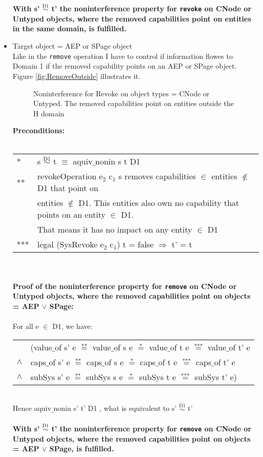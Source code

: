 \begin{itemize}
\textbf{With s' $\overset{\text{D1}}{\sim}$ t' the noninterference property for \texttt{revoke} on CNode or Untyped objects, where the removed capabilities point on entities in the same domain, is fulfilled.}  
\item Target object = AEP or SPage object \\
Like in the \texttt{remove} operation I have to control if information flowes to Domain 1 if the removed capability points on an AEP or SPage object. Figure \ref{fig:RemoveOutside} illustrates it. 
\begin{figure}[H]
\caption{Noninterference for Revoke on object types = CNode or Untyped. The removed capabilities point on entities outside the H domain}
\label{fig:RevokeOutside}
\end{figure}
\textbf{Preconditions:} \\ \\
\begin{tabular}{ll}
* & s $\overset{\text{D1}}{\sim}$ t $\equiv$ aquiv$\_$nonin s t D1	\\ 
** & revokeOperation e$_2$ c$_1$ s removes capabilities $\in$ entities $\notin$ D1 that point on \\
& entities $\notin$ D1. This entities also own no capability that points on an entity $\in$ D1. \\
& That means it has no impact on any entity $\in$ D1 \\ 
*** & legal (SysRevoke e$_2$ c$_1$) t = false $\Rightarrow$ t' = t
\end{tabular} \\ \\ 
\textbf{Proof of the noninterference property for \texttt{remove} on CNode or Untyped objects, where the removed capabilities point on objects = AEP $\vee$ SPage:}\\ \\
For all e $\in$ D1, we have: \\ 
\begin{tabular}{ll}
& (value$\_$of s' e $\overset{\text{**}}{=}$ value$\_$of s e $\overset{\text{*}}{=}$ value$\_$of t e $\overset{\text{***}}{=}$ value$\_$of t' e \\
$\wedge$ & caps$\_$of s' e $\overset{\text{**}}{=}$ caps$\_$of s e $\overset{\text{*}}{=}$ caps$\_$of t e $\overset{\text{***}}{=}$ caps$\_$of t' e \\
$\wedge$ & subSys s' e $\overset{\text{**}}{=}$ subSys s e $\overset{\text{*}}{=}$ subSys t e $\overset{\text{***}}{=}$ subSys t' e)
\end{tabular} \\
Hence aquiv$\_$nonin s' t' D1 , what is equivalent to s' $\overset{\text{D1}}{\sim}$ t'\\ \\ 
\textbf{With s' $\overset{\text{D1}}{\sim}$ t' the noninterference property for \texttt{remove} on CNode or Untyped objects, where the removed capabilities point on objects = AEP $\vee$ SPage, is fulfilled.}  
\end{itemize}
